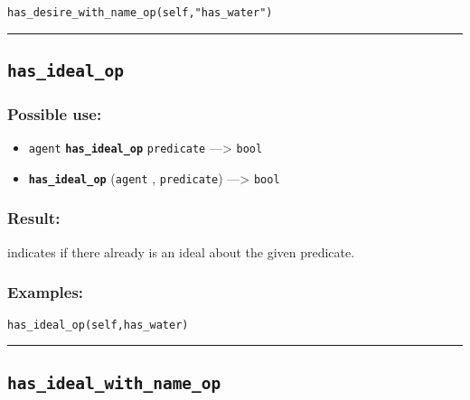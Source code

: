 \documentclass[]{book}
\providecommand{\tightlist}{%
  \setlength{\itemsep}{0pt}\setlength{\parskip}{0pt}}
\theoremstyle{definition}
\theoremstyle{definition}
\theoremstyle{definition}
\theoremstyle{remark}
\begin{document}
\begin{verbatim}
has_desire_with_name_op(self,"has_water") 
\end{verbatim}

\begin{center}\rule{0.5\linewidth}{\linethickness}\end{center}

\subsection{\texorpdfstring{\texttt{has\_ideal\_op}}{has\_ideal\_op}}\label{has_ideal_op}

\subsubsection{Possible use:}\label{possible-use-250}

\begin{itemize}
\tightlist
\item
  \texttt{agent} \textbf{\texttt{has\_ideal\_op}} \texttt{predicate}
  ---\textgreater{} \texttt{bool}
\item
  \textbf{\texttt{has\_ideal\_op}} (\texttt{agent} , \texttt{predicate})
  ---\textgreater{} \texttt{bool}
\end{itemize}

\subsubsection{Result:}\label{result-241}

indicates if there already is an ideal about the given predicate.

\subsubsection{Examples:}\label{examples-190}

\begin{verbatim}
has_ideal_op(self,has_water) 
\end{verbatim}

\begin{center}\rule{0.5\linewidth}{\linethickness}\end{center}

\subsection{\texorpdfstring{\texttt{has\_ideal\_with\_name\_op}}{has\_ideal\_with\_name\_op}}\label{has_ideal_with_name_op}
\end{document}
